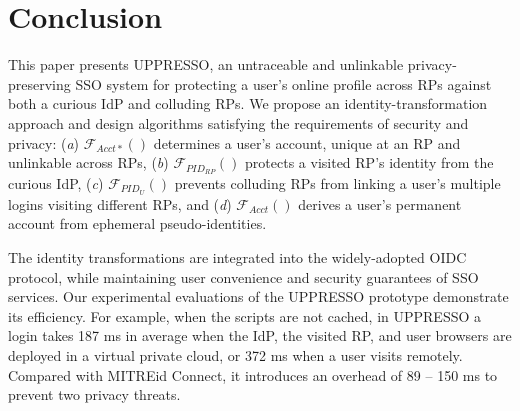 \section{Conclusion}
\label{sec:conclusion}
This paper presents UPPRESSO, an untraceable and unlinkable privacy-preserving SSO system for protecting a user's online profile across RPs against both a curious IdP and colluding RPs.
We propose an identity-transformation approach and design algorithms satisfying the requirements of security and privacy: (\emph{a}) $\mathcal{F}_{Acct\ast}()$ determines a user's account, unique at an RP and unlinkable across RPs,
(\emph{b}) $\mathcal{F}_{PID_{RP}}()$ protects a visited RP's identity from the curious IdP, (\emph{c}) $\mathcal{F}_{PID_{U}}()$ prevents colluding RPs from linking a user's multiple logins visiting different RPs, and (\emph{d}) $\mathcal{F}_{Acct}()$ derives a user's permanent account from ephemeral pseudo-identities.

The identity transformations are integrated into the widely-adopted OIDC protocol, while maintaining user convenience and security guarantees of SSO services. Our experimental evaluations of the UPPRESSO prototype demonstrate its efficiency.
For example,
            when the scripts are not cached,
in UPPRESSO a login takes 187 ms in average when the IdP, the visited RP, and user browsers are deployed in a virtual private cloud, or 372 ms when a user visits remotely.
Compared with MITREid Connect,
it introduces an overhead of 89 -- 150 ms to prevent two privacy threats.



